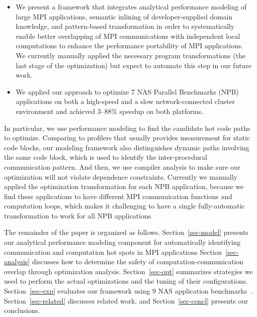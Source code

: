 \begin{itemize}

\item We present a framework that integrates analytical performance
  modeling of large MPI applications, semantic inlining of
  developer-supplied domain knowledge, and pattern-based
  transformation in order to systematically enable better overlapping
  of MPI communications with independent local computations to enhance
  the performance portability of MPI applications. We currently
  manually applied the necessary program transformations (the last
  stage of the optimization) but expect to automate this step in our
  future work.

\item We applied our approach to optimize 7 NAS Parallel Benchmarks
  (NPB) applications on both a high-speed and a slow network-connected
  cluster environment and achieved 3--88\% speedup on both platforms.

\end{itemize}

In particular, we use performance modeling to find the candidate hot code paths to optimize.
Comparing to profilers that usually provides measurement for static code blocks,
  our modeling framework also distinguishes dynamic paths involving the same code block,
  which is used to identify the inter-procedural communication pattern.
And then, we use compiler analysis to make sure our optimization will not violate dependence constraints.
Currently we manually applied the optimization transformation for each NPB application,
  because we find these applications to have different MPI communication functions and computation loops,
  which makes it challenging to have a single fully-automatic transformation to work for all NPB applications.

The remainder of the paper is organized as follows.
Section~\ref{sec-model} presents our analytical performance modeling
component for automatically identifying communication and computation
hot spots in MPI applications Section~\ref{sec-analysis} discusses how
to determine the safety of computation-communication overlap through
optimization analysis.  Section~\ref{sec-opt} summarizes strategies we
used to perform the actual optimizations and the tuning of their
configurations.  Section~\ref{sec-exp} evaluates our framework using 9
NAS application benchmarks~\cite{npb}.  Section~\ref{sec-related}
discusses related work, and Section~\ref{sec-concl} presents our
conclusions.
